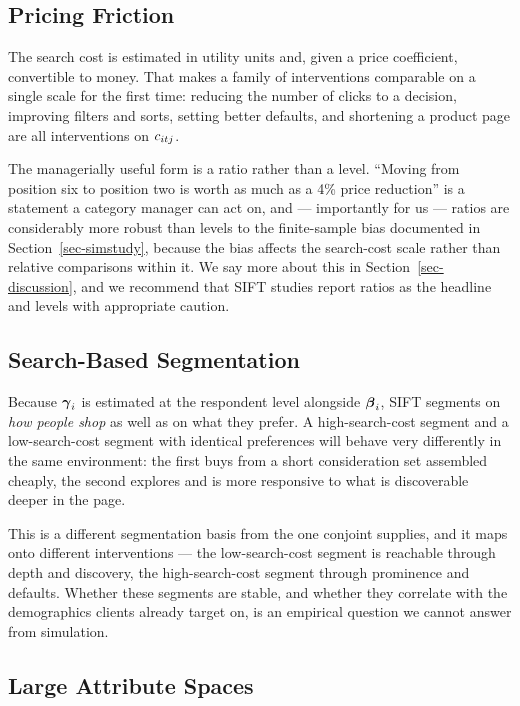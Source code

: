 \documentclass[
  letterpaper,
  DIV=11,
  numbers=noendperiod]{scrartcl}
\begin{document}
\subsection{Pricing Friction}\label{sec-managerial-friction}

The search cost is estimated in utility units and, given a price
coefficient, convertible to money. That makes a family of interventions
comparable on a single scale for the first time: reducing the number of
clicks to a decision, improving filters and sorts, setting better
defaults, and shortening a product page are all interventions on
\(c_{itj}\).

The managerially useful form is a ratio rather than a level. ``Moving
from position six to position two is worth as much as a 4\% price
reduction'' is a statement a category manager can act on, and ---
importantly for us --- ratios are considerably more robust than levels
to the finite-sample bias documented in Section~\ref{sec-simstudy},
because the bias affects the search-cost scale rather than relative
comparisons within it. We say more about this in
Section~\ref{sec-discussion}, and we recommend that SIFT studies report
ratios as the headline and levels with appropriate caution.

\subsection{Search-Based
Segmentation}\label{sec-managerial-segmentation}

Because \(\boldsymbol{\gamma}_i\) is estimated at the respondent level alongside
\(\boldsymbol{\beta}_i\), SIFT segments on \emph{how people shop} as well as on
what they prefer. A high-search-cost segment and a low-search-cost
segment with identical preferences will behave very differently in the
same environment: the first buys from a short consideration set
assembled cheaply, the second explores and is more responsive to what is
discoverable deeper in the page.

This is a different segmentation basis from the one conjoint supplies,
and it maps onto different interventions --- the low-search-cost segment
is reachable through depth and discovery, the high-search-cost segment
through prominence and defaults. Whether these segments are stable, and
whether they correlate with the demographics clients already target on,
is an empirical question we cannot answer from simulation.

\subsection{Large Attribute Spaces}\label{sec-managerial-attributes}
\end{document}
